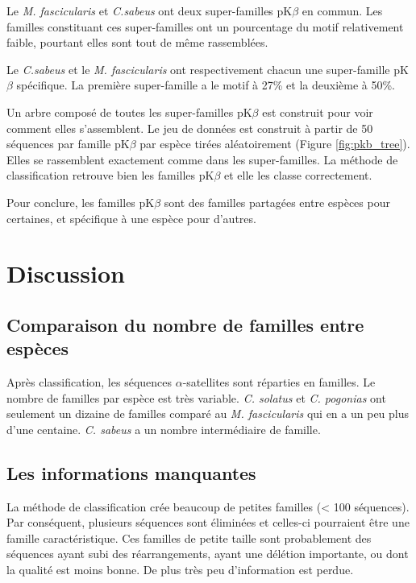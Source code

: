 \documentclass[12pt,a4paper]{article}
\begin{document}
	Le \textit{M. fascicularis} et \textit{C.sabeus} ont deux super-familles pK$\beta$ en commun. Les familles constituant ces super-familles ont un pourcentage du motif relativement faible, pourtant elles sont tout de même rassemblées. 
	
	Le \textit{C.sabeus} et le \textit{M. fascicularis} ont respectivement chacun une super-famille pK$\beta$ spécifique. La première super-famille a le motif à 27\% et la deuxième à 50\%.
		
	Un arbre composé de toutes les super-familles pK$\beta$ est construit pour voir comment elles s'assemblent. Le jeu de données est construit à partir de 50 séquences par famille pK$\beta$ par espèce tirées aléatoirement (Figure \ref{fig:pkb_tree}). Elles se rassemblent exactement comme dans les super-familles. La méthode de classification retrouve bien les familles pK$\beta$ et elle les classe correctement.
	
	Pour conclure, les familles pK$\beta$ sont des familles partagées entre espèces pour certaines, et spécifique à une espèce pour d'autres.

\section{Discussion}
	\subsection{Comparaison du nombre de familles entre espèces}
	Après classification, les séquences $\alpha$-satellites sont réparties en familles. Le nombre de familles par espèce est très variable. \textit{C. solatus} et \textit{C. pogonias} ont seulement un dizaine de familles comparé au \textit{M. fascicularis} qui en a un peu plus d'une centaine. \textit{C. sabeus} a un nombre intermédiaire de famille.
	\subsection{Les informations manquantes}
	La méthode de classification crée beaucoup de petites familles (< 100 séquences). Par conséquent, plusieurs séquences sont éliminées et celles-ci pourraient être  une famille caractéristique. Ces familles de petite taille sont probablement des séquences ayant subi des réarrangements, ayant une délétion importante, ou dont la qualité est moins bonne. De plus très peu d'information est perdue.
\end{document}
